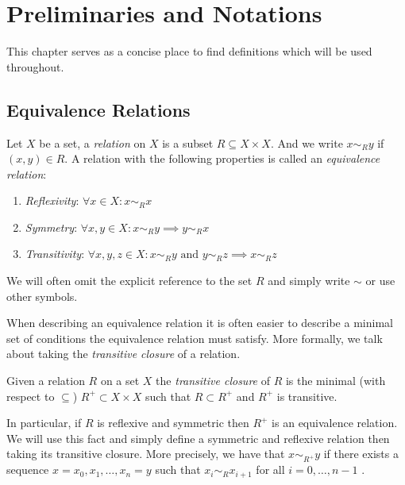 \chapter{Preliminaries and Notations}
\label{chapter__preliminaries}

This chapter serves as a concise place to find definitions which will be used throughout.
\section{Equivalence Relations}

\begin{definition}{}{}
    Let $X$ be a set, a \emph{relation} on $X$ is a subset $R \subseteq X \times X$. And we write $x \sim_R y$ if $(x,y) \in R$.
    A relation with the following properties is called an \emph{equivalence relation}:
    \begin{enumerate}
        \item \emph{Reflexivity}: $\forall x \in X: x \sim_R x$
        \item \emph{Symmetry}: $\forall x,y \in X: x \sim_R y \implies y \sim_R x$
        \item \emph{Transitivity}: $\forall x,y,z \in X: x \sim_R y \text{ and } y \sim_R z \implies x \sim_R z$
    \end{enumerate}
    We will often omit the explicit reference to the set $R$ and simply write $\sim$ or use other symbols.
\end{definition}

When describing an equivalence relation it is often easier to describe a minimal set of conditions the equivalence relation must satisfy. More formally, we talk about taking the \emph{transitive closure} of a relation.

\begin{definition}{}{}
    Given a relation $R$ on a set $X$ the \emph{transitive closure} of $R$ is the minimal (with respect to $\subseteq$) $R^+ \subset X \times X$ such that $R \subset R^+$ and $R^+$ is transitive.
\end{definition}

In particular, if $R$ is reflexive and symmetric then $R^+$ is an equivalence relation.
We will use this fact and simply define a symmetric and reflexive relation then taking its transitive closure.
More precisely, we have that $x \sim_{R^+} y$ if there exists a sequence $x = x_0, x_1, \dots, x_n = y$ such that $x_i \sim_R x_{i+1}$ for all $i = 0, \dots, n-1$ \cite[p.~337]{Lidl1997-kc}.

